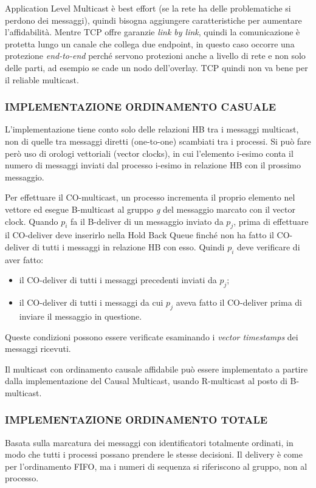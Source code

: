 \vspace{5mm}

Application Level Multicast è best effort (se la rete ha delle problematiche si perdono dei messaggi), quindi bisogna aggiungere caratteristiche per aumentare l'affidabilità. Mentre TCP offre garanzie \textit{link by link}, quindi la comunicazione è protetta lungo un canale che collega due endpoint, in questo caso occorre una protezione \textit{end-to-end} perché servono protezioni anche a livello di rete e non solo delle parti, ad esempio se cade un nodo dell'overlay. TCP quindi non va bene per il reliable multicast.

\subsubsection{IMPLEMENTAZIONE ORDINAMENTO CASUALE}
L'implementazione tiene conto solo delle relazioni HB tra i messaggi multicast, non di quelle tra messaggi diretti (one-to-one) scambiati tra i processi. Si può fare però uso di orologi vettoriali (vector clocks), in cui l'elemento i-esimo conta  il numero di messaggi inviati dal processo i-esimo in relazione HB con il prossimo messaggio.

Per effettuare il CO-multicast, un processo incrementa il proprio elemento nel vettore ed esegue B-multicast al gruppo \textit{g} del messaggio marcato con il vector clock. Quando $p_{i}$ fa il B-deliver di un messaggio inviato da $p_{j}$, prima di effettuare il CO-deliver deve inserirlo nella Hold Back Queue finché non ha fatto il CO-deliver di tutti i messaggi in relazione HB con esso. Quindi $p_{i}$ deve verificare di aver fatto:
\begin{itemize}
    \item il CO-deliver di tutti i messaggi precedenti inviati da $p_{j}$;
    \item il CO-deliver di tutti i messaggi da cui $p_{j}$ aveva fatto il CO-deliver prima di inviare il messaggio in questione.
\end{itemize}
Queste condizioni possono essere verificate esaminando i \textit{vector timestamps} dei messaggi ricevuti.

\noindent Il multicast con ordinamento causale affidabile può essere implementato a partire dalla implementazione del Causal Multicast, usando R-multicast al posto di B-multicast.

\subsubsection{IMPLEMENTAZIONE ORDINAMENTO TOTALE}
Basata sulla marcatura dei messaggi con identificatori totalmente ordinati, in modo che tutti i processi possano prendere le stesse decisioni. Il delivery è come per l'ordinamento FIFO, ma i numeri di sequenza si riferiscono al gruppo, non al processo.

